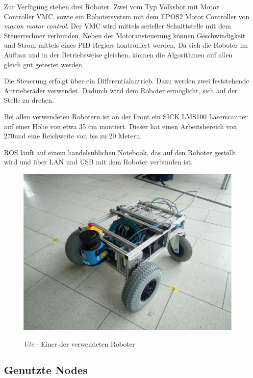 \documentclass[11pt,a4paper]{article}
\begin{document}
{Zur Verf\"ugung stehen drei Roboter. Zwei vom Typ Volksbot mit Motor Controller VMC, sowie ein Robotersystem mit dem EPOS2 Motor Controller von \textit{maxon motor control}. Der VMC \cite{Volksbot} wird mittels serieller Schnittstelle mit dem Steuerrechner verbunden. Neben der Motoransteuerung k\"onnen Geschwindigkeit und Strom mittels eines PID-Reglers kontrolliert werden. 
Da sich die Roboter im Aufbau und in der Betriebsweise gleichen, können die Algorithmen auf allen gleich gut getestet werden.
 
Die Steuerung erfolgt \"uber ein Differentialantrieb. Dazu werden zwei feststehende Antriebsr\"ader verwendet. Dadurch wird dem Roboter erm\"oglicht, sich auf der Stelle zu drehen.

Bei allen verwendeten Robotern ist an der Front ein SICK LMS100 Laserscanner auf einer H\"ohe von etwa 35 cm montiert. Dieser hat einen Arbeitsbereich von 270\degree  und eine Reichweite von bis zu 20 Metern.\cite{lms} 
 
ROS l\"auft auf einem handels\"ublichen Notebook, das auf den Roboter gestellt wird und \"uber LAN und USB mit dem Roboter verbunden ist. 
 

\begin{figure}[h]
	\centering
	{\includegraphics[trim= 2cm 2cm 2cm 2cm, clip=true,width=\linewidth]{pictures/robot.jpg}}
	\caption{\textit{Ute} - Einer der verwendeten Roboter}
\end{figure}


\subsection{Genutzte Nodes}
{
	
}}
\end{document}
